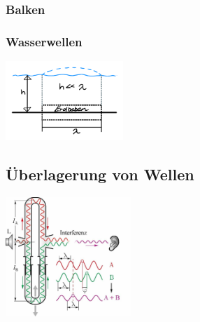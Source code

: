 \subsubsection{Balken}
\subsubsection{Wasserwellen}


\begin{center}
	\begin{minipage}{0.3\textwidth}
	\end{minipage}%
	\begin{minipage}{0.2\textwidth}
		\includegraphics[height=3cm,keepaspectratio=true]{Images/Wasserwelle.png}
	\end{minipage}
\end{center}


\subsection{Überlagerung von Wellen}
\begin{center}
	\begin{minipage}{0.3\textwidth}
	\end{minipage}%
	\begin{minipage}{0.2\textwidth}
		\includegraphics[height=4.5cm,right,keepaspectratio=true]{Images/wellen_ueberlagerung_selbe_quelle.png}
	\end{minipage}
\end{center}

